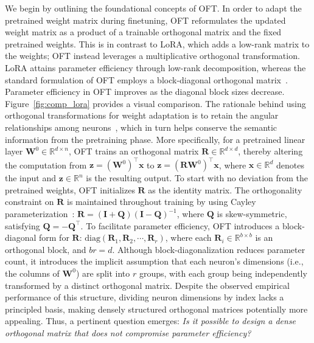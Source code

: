We begin by outlining the foundational concepts of OFT. In order to adapt the pretrained weight matrix during finetuning, OFT reformulates the updated weight matrix as a product of a trainable orthogonal matrix and the fixed pretrained weights. This is in contrast to LoRA, which adds a low-rank matrix to the weights; OFT instead leverages a multiplicative orthogonal transformation. LoRA attains parameter efficiency through low-rank decomposition, whereas the standard formulation of OFT employs a block-diagonal orthogonal matrix~\cite{qiu2023controlling}. Parameter efficiency in OFT improves as the diagonal block sizes decrease. Figure~\ref{fig:comp_lora} provides a visual comparison. The rationale behind using orthogonal transformations for weight adaptation is to retain the angular relationships among neurons~\cite{liu2018learning,liu2021orthogonal,qiu2023controlling}, which in turn helps conserve the semantic information from the pretraining phase. More specifically, for a pretrained linear layer $\bm{W}^0\in\mathbb{R}^{d\times n}$, OFT trains an orthogonal matrix $\bm{R}\in\mathbb{R}^{d\times d}$, thereby altering the computation from $\bm{z}=(\bm{W}^0)^\top\bm{x}$ to $\bm{z}=(\bm{R}\bm{W}^0)^\top\bm{x}$, where $\bm{x}\in\mathbb{R}^{d}$ denotes the input and $\bm{z}\in\mathbb{R}^{n}$ is the resulting output. To start with no deviation from the pretrained weights, OFT initializes $\bm{R}$ as the identity matrix. The orthogonality constraint on $\bm{R}$ is maintained throughout training by using Cayley parameterization~\cite{qiu2023controlling,liu2021orthogonal}: $\bm{R}=(\bm{I}+\bm{Q})(\bm{I}-\bm{Q})^{-1}$, where $\bm{Q}$ is skew-symmetric, satisfying $\bm{Q}=-\bm{Q}^\top$. To facilitate parameter efficiency, OFT introduces a block-diagonal form for $\bm{R}$: $\text{diag}(\bm{R}_1,\bm{R}_2,\cdots,\bm{R}_r)$, where each $\bm{R}_i\in\mathbb{R}^{b\times b}$ is an orthogonal block, and $br=d$. Although block-diagonalization reduces parameter count, it introduces the implicit assumption that each neuron's dimensions (i.e., the columns of $\bm{W}^0$) are split into $r$ groups, with each group being independently transformed by a distinct orthogonal matrix. Despite the observed empirical performance of this structure, dividing neuron dimensions by index lacks a principled basis, making densely structured orthogonal matrices potentially more appealing. Thus, a pertinent question emerges: \emph{Is it possible to design a dense orthogonal matrix that does not compromise parameter efficiency?}

